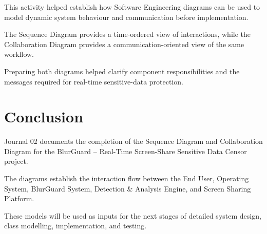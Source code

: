 \documentclass[12pt,a4paper]{article}
\begin{document}
This activity helped establish how Software Engineering diagrams can be used to model dynamic system behaviour and communication before implementation.

The Sequence Diagram provides a time-ordered view of interactions, while the Collaboration Diagram provides a communication-oriented view of the same workflow.

Preparing both diagrams helped clarify component responsibilities and the messages required for real-time sensitive-data protection.



\section{Conclusion}

Journal 02 documents the completion of the Sequence Diagram and Collaboration Diagram for the BlurGuard -- Real-Time Screen-Share Sensitive Data Censor project.

The diagrams establish the interaction flow between the End User, Operating System, BlurGuard System, Detection \& Analysis Engine, and Screen Sharing Platform.

These models will be used as inputs for the next stages of detailed system design, class modelling, implementation, and testing.
\end{document}
